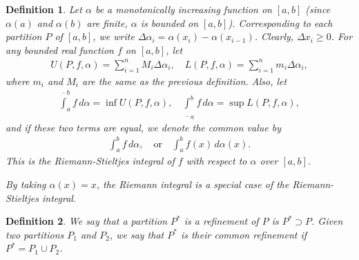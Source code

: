 \documentclass[10pt]{book}
\newtheorem{definition}{Definition}[chapter]
\theoremstyle{definition}
\numberwithin{equation}{chapter}
\begin{document}
\begin{definition}
Let $\alpha$ be a monotonically increasing function on $[a,b]$ (since $\alpha(a)$ and $\alpha(b)$ are finite, $\alpha$ is bounded on $[a,b]$). Corresponding to each partition $P$ of $[a,b]$, we write $\Delta \alpha_i = \alpha(x_i) - \alpha(x_{i-1})$. Clearly, $\Delta x_i \geq 0$. For any bounded real function $f$ on $[a,b]$, let
\begin{align*}
    U(P,f,\alpha) = \sum^n_{i=1} M_i \Delta \alpha_i, \quad L(P,f,\alpha) = \sum^n_{i=1} m_i \Delta \alpha_i,
\end{align*}
where $m_i$ and $M_i$ are the same as the previous definition. Also, let
\begin{align*}
    \overline{\int}^b_a f \,d\alpha = \inf U(P,f,\alpha), \quad \underline{\int}^b_a f \,d\alpha = \sup L(P,f,\alpha),
\end{align*}
and if these two terms are equal, we denote the common value by
\begin{align*}
    \int^b_a f \,d\alpha, \quad \text{or} \quad \int^b_a f(x) \,d\alpha(x).
\end{align*}
This is the Riemann-Stieltjes integral of $f$ with respect to $\alpha$ over $[a,b]$. 

By taking $\alpha(x) = x$, the Riemann integral is a special case of the Riemann-Stieltjes integral. 
\end{definition}

\medskip

\begin{definition}
We say that a partition $P^*$ is a refinement of $P$ is  $P^* \supset P$. Given two partitions $P_1$ and $P_2$, we say that $P^*$ is their common refinement if $P^* = P_1 \cup P_2$.
\end{definition}


\medskip
\end{document}
